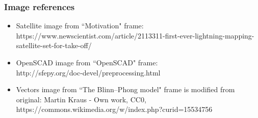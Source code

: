 \documentclass{beamer}
\begin{document}
\begin{frame}[t]
\frametitle{Image references}
\begin{itemize}
\item Satellite image from ``Motivation" frame: \\
https://www.newscientist.com/article/2113311-first-ever-lightning-mapping-satellite-set-for-take-off/ 
\item OpenSCAD image from ``OpenSCAD" frame: \\
http://sfepy.org/doc-devel/preprocessing.html
\item Vectors image from ``The Blinn--Phong model" frame is modified from original:
Martin Kraus - Own work, CC0, https://commons.wikimedia.org/w/index.php?curid=15534756
\end{itemize}
\end{frame}
\end{document}
